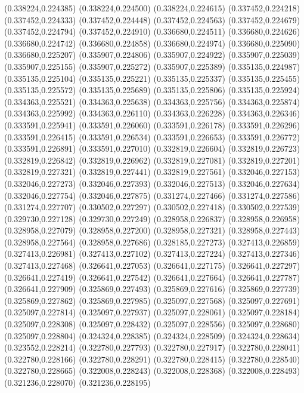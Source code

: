 (0.338224,0.224385)
(0.338224,0.224500)
(0.338224,0.224615)
(0.337452,0.224218)
(0.337452,0.224333)
(0.337452,0.224448)
(0.337452,0.224563)
(0.337452,0.224679)
(0.337452,0.224794)
(0.337452,0.224910)
(0.336680,0.224511)
(0.336680,0.224626)
(0.336680,0.224742)
(0.336680,0.224858)
(0.336680,0.224974)
(0.336680,0.225090)
(0.336680,0.225207)
(0.335907,0.224806)
(0.335907,0.224922)
(0.335907,0.225039)
(0.335907,0.225155)
(0.335907,0.225272)
(0.335907,0.225389)
(0.335135,0.224987)
(0.335135,0.225104)
(0.335135,0.225221)
(0.335135,0.225337)
(0.335135,0.225455)
(0.335135,0.225572)
(0.335135,0.225689)
(0.335135,0.225806)
(0.335135,0.225924)
(0.334363,0.225521)
(0.334363,0.225638)
(0.334363,0.225756)
(0.334363,0.225874)
(0.334363,0.225992)
(0.334363,0.226110)
(0.334363,0.226228)
(0.334363,0.226346)
(0.333591,0.225941)
(0.333591,0.226060)
(0.333591,0.226178)
(0.333591,0.226296)
(0.333591,0.226415)
(0.333591,0.226534)
(0.333591,0.226653)
(0.333591,0.226772)
(0.333591,0.226891)
(0.333591,0.227010)
(0.332819,0.226604)
(0.332819,0.226723)
(0.332819,0.226842)
(0.332819,0.226962)
(0.332819,0.227081)
(0.332819,0.227201)
(0.332819,0.227321)
(0.332819,0.227441)
(0.332819,0.227561)
(0.332046,0.227153)
(0.332046,0.227273)
(0.332046,0.227393)
(0.332046,0.227513)
(0.332046,0.227634)
(0.332046,0.227754)
(0.332046,0.227875)
(0.331274,0.227466)
(0.331274,0.227586)
(0.331274,0.227707)
(0.330502,0.227297)
(0.330502,0.227418)
(0.330502,0.227539)
(0.329730,0.227128)
(0.329730,0.227249)
(0.328958,0.226837)
(0.328958,0.226958)
(0.328958,0.227079)
(0.328958,0.227200)
(0.328958,0.227321)
(0.328958,0.227443)
(0.328958,0.227564)
(0.328958,0.227686)
(0.328185,0.227273)
(0.327413,0.226859)
(0.327413,0.226981)
(0.327413,0.227102)
(0.327413,0.227224)
(0.327413,0.227346)
(0.327413,0.227468)
(0.326641,0.227053)
(0.326641,0.227175)
(0.326641,0.227297)
(0.326641,0.227419)
(0.326641,0.227542)
(0.326641,0.227664)
(0.326641,0.227787)
(0.326641,0.227909)
(0.325869,0.227493)
(0.325869,0.227616)
(0.325869,0.227739)
(0.325869,0.227862)
(0.325869,0.227985)
(0.325097,0.227568)
(0.325097,0.227691)
(0.325097,0.227814)
(0.325097,0.227937)
(0.325097,0.228061)
(0.325097,0.228184)
(0.325097,0.228308)
(0.325097,0.228432)
(0.325097,0.228556)
(0.325097,0.228680)
(0.325097,0.228804)
(0.324324,0.228385)
(0.324324,0.228509)
(0.324324,0.228634)
(0.323552,0.228214)
(0.322780,0.227793)
(0.322780,0.227917)
(0.322780,0.228041)
(0.322780,0.228166)
(0.322780,0.228291)
(0.322780,0.228415)
(0.322780,0.228540)
(0.322780,0.228665)
(0.322008,0.228243)
(0.322008,0.228368)
(0.322008,0.228493)
(0.321236,0.228070)
(0.321236,0.228195)
